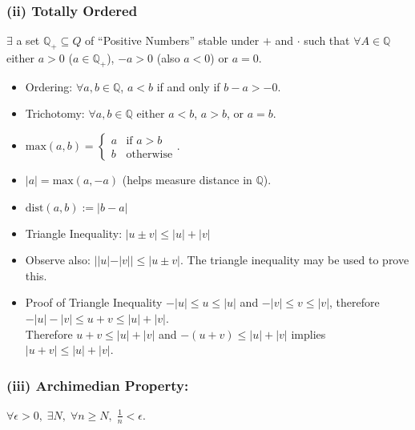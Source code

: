 \documentclass[11pt]{article}
\newcommand{\0}{\emptyset}
\newcommand{\Q}{\mathbb{Q}}
\begin{document}
\subsubsection*{(ii) Totally Ordered}
\label{sec:org842b026}
\(\exists\) a set \(\Q_{+}\subseteq Q\) of ``Positive Numbers'' stable under \(+\) and \(\cdot\) such that \(\forall A\in\Q\) either \(a>0\) (\(a\in\Q_{+}\)), \(-a>0\) (also \(a<0\)) or \(a=0\).\\[0pt]
\begin{itemize}
\item Ordering: \(\forall a,b\in\Q\), \(a<b\) if and only if \(b-a>-0\).\\[0pt]
\item Trichotomy: \(\forall a,b\in\Q\) either \(a<b\), \(a>b\), or \(a=b\).\\[0pt]
\item \(\text{max}(a,b)=\begin{cases}a &\text{if } a>b \\ b &\text{otherwise}\end{cases}\).\\[0pt]
\item \(|a|=\text{max}(a,-a)\) (helps measure distance in \(\Q\)).\\[0pt]
\item \(\text{dist}(a,b):=|b-a|\)\\[0pt]
\item Triangle Inequality: \(|u\pm v|\leq|u|+|v|\)\\[0pt]
\item Observe also: \(||u|-|v||\leq|u\pm v|\). The triangle inequality may be used to prove this.\\[0pt]
\end{itemize}
\begin{itemize}
\item Proof of Triangle Inequality
\label{sec:org9e640aa}
\(-|u|\leq u\leq|u|\) and \(-|v|\leq v\leq|v|\), therefore \(-|u|-|v|\leq u+v\leq |u|+|v|\).\\[0pt]
Therefore \(u+v\leq|u|+|v|\) and \(-(u+v)\leq |u|+|v|\) implies \(|u+v|\leq|u|+|v|\).\\[0pt]
\end{itemize}
\subsubsection*{(iii) Archimedian Property:}
\label{sec:org61b35fb}
\(\forall\epsilon>0,\;\exists N,\;\forall n\geq N,\;\frac{1}{n}<\epsilon\).\\[0pt]
\end{document}
